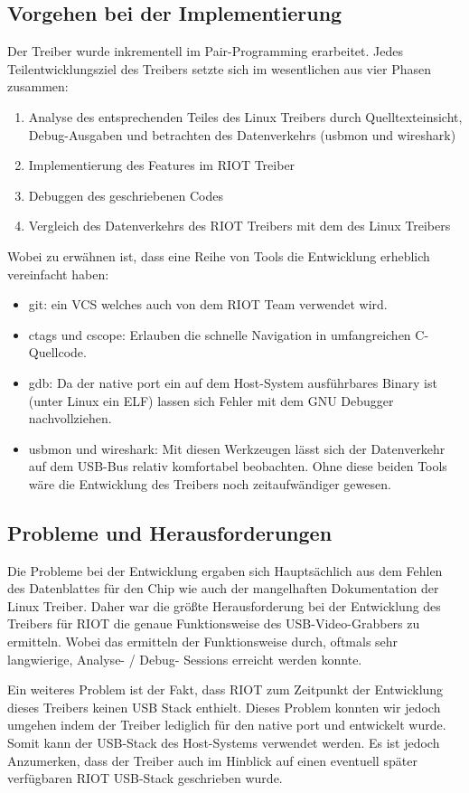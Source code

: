 \subsection{Vorgehen bei der Implementierung}
Der Treiber wurde inkrementell im Pair-Programming erarbeitet. Jedes Teilentwicklungsziel des Treibers setzte sich im wesentlichen aus vier Phasen zusammen:
\begin{enumerate}
 \item Analyse des entsprechenden Teiles des Linux Treibers durch Quelltexteinsicht, Debug-Ausgaben und betrachten des Datenverkehrs (usbmon und wireshark)
 \item Implementierung des Features im RIOT Treiber
 \item Debuggen des geschriebenen Codes
 \item Vergleich des Datenverkehrs des RIOT Treibers mit dem des Linux Treibers
\end{enumerate}

Wobei zu erwähnen ist, dass eine Reihe von Tools die Entwicklung erheblich vereinfacht haben:
\begin{itemize}
 \item git: ein VCS welches auch von dem RIOT Team verwendet wird. 
 \item ctags und cscope: Erlauben die schnelle Navigation in umfangreichen C-Quellcode.
 \item gdb: Da der native port ein auf dem Host-System ausführbares Binary ist (unter Linux ein ELF) lassen sich Fehler mit dem GNU Debugger nachvollziehen.
 \item usbmon und wireshark: Mit diesen Werkzeugen lässt sich der Datenverkehr auf dem USB-Bus relativ komfortabel beobachten. Ohne diese beiden Tools wäre die Entwicklung des Treibers noch zeitaufwändiger gewesen. 
\end{itemize}

\subsection{Probleme und Herausforderungen}
Die Probleme bei der Entwicklung ergaben sich Hauptsächlich aus dem Fehlen des Datenblattes für den \stk{} Chip wie auch der mangelhaften Dokumentation der Linux Treiber. Daher war die größte Herausforderung bei der Entwicklung des Treibers für RIOT die genaue Funktionsweise des USB-Video-Grabbers zu ermitteln. Wobei das ermitteln der Funktionsweise durch, oftmals sehr langwierige, Analyse- / Debug- Sessions erreicht werden konnte.

Ein weiteres Problem ist der Fakt, dass RIOT zum Zeitpunkt der Entwicklung dieses Treibers keinen USB Stack enthielt. Dieses Problem konnten wir jedoch umgehen indem der Treiber lediglich für den native port und \libusb{} entwickelt wurde. Somit kann der USB-Stack des Host-Systems verwendet werden. Es ist jedoch Anzumerken, dass der Treiber auch im Hinblick auf einen eventuell später verfügbaren RIOT USB-Stack geschrieben wurde.  